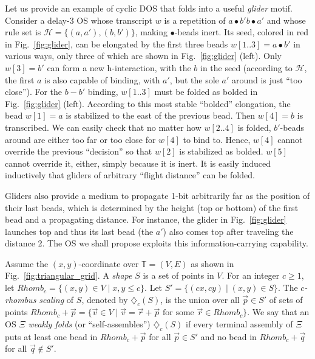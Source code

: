 \documentclass[dvipdfmx,review]{elsarticle}
\begin{document}

Let us provide an example of cyclic DOS that folds into a useful \textit{glider} motif. 
Consider a delay-3 OS whose transcript $w$ is a repetition of $a \bullet b' b \bullet a'$ and whose rule set is $\mathcal{H} = \{(a, a'), (b, b')\}$, making $\bullet$-beads inert. 
Its seed, colored in red in Fig.~\ref{fig:glider}, can be elongated by the first three beads $w[1..3] = a \bullet b'$ in various ways, only three of which are shown in Fig.~\ref{fig:glider} (left). 
Only $w[3] = b'$ can form a new h-interaction, with the $b$ in the seed (according to $\mathcal{H}$, the first $a$ is also capable of binding, with $a'$, but the sole $a'$ around is just ``too close''). 
For the $b{-}b'$ binding, $w[1..3]$ must be folded as bolded in Fig.~\ref{fig:glider} (left). 
According to this most stable ``bolded'' elongation, the bead $w[1] = a$ is stabilized to the east of the previous bead. 
Then $w[4] = b$ is transcribed. 
We can easily check that no matter how $w[2..4]$ is folded, $b'$-beads around are either too far or too close for $w[4]$ to bind to. 
Hence, $w[4]$ cannot override the previous ``decision'' so that $w[2]$ is stabilized as bolded. 
$w[5]$ cannot override it, either, simply because it is inert. 
It is easily induced inductively that gliders of arbitrary ``flight distance'' can be folded. 

Gliders also provide a medium to propagate 1-bit arbitrarily far as the position of their last beads, which is determined by the height (top or bottom) of the first bead and a propagating distance.  
For instance, the glider in Fig.~\ref{fig:glider} launches top and thus its last bead (the $a'$) also comes top after traveling the distance 2.
The OS we shall propose exploits this information-carrying capability.

Assume the $(x, y)$-coordinate over $\mathbb{T} = (V, E)$ as shown in Fig.~\ref{fig:triangular_grid}. 
A \textit{shape} $S$ is a set of points in $V$. 
For an integer $c \ge 1$, let $Rhomb_c = \{(x, y) \in V \mid x, y \le c\}$.
Let $S' = \{(cx, cy) \mid (x, y) \in S\}$. 
The \textit{$c$-rhombus scaling} of $S$, denoted by $\diamondsuit_c(S)$, is the union over all $\vec{p} \in S'$ of sets of points $Rhomb_c + \vec{p} = \{\vec{v} \in V \mid \mbox{$\vec{v} = \vec{r} + \vec{p}$ for some $\vec{r} \in Rhomb_c$}\}$.
We say that an OS $\Xi$ \textit{weakly folds} (or ``self-assembles'') $\diamondsuit_c(S)$ if every terminal assembly of $\Xi$ puts at least one bead in $Rhomb_c + \vec{p}$ for all $\vec{p} \in S'$ and no bead in $Rhomb_c + \vec{q}$ for all $\vec{q} \not\in S'$. 
\end{document}
